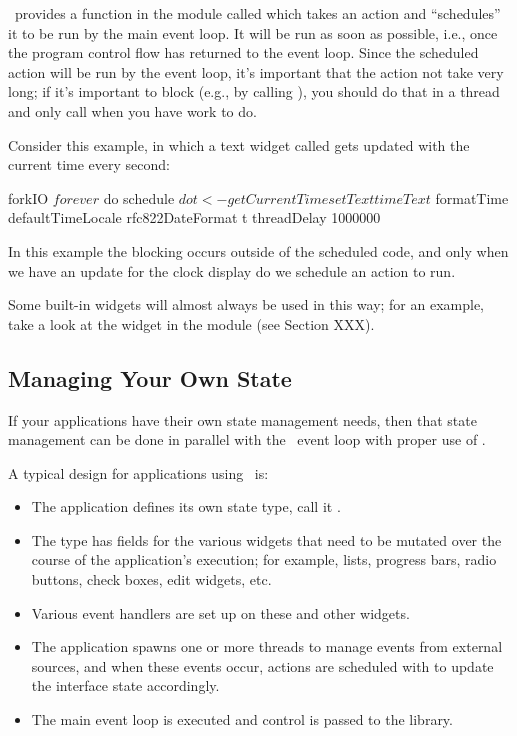 \vtyui\ provides a function in the  module called
 which takes an  action and ``schedules'' it to be
run by the main event loop.  It will be run as soon as possible, i.e.,
once the program control flow has returned to the event loop.  Since
the scheduled action will be run by the event loop, it's important
that the action not take very long; if it's important to block (e.g.,
by calling ), you should do that in
a thread and only call  when you have work to do.

Consider this example, in which a text widget called 
gets updated with the current time every second:

\begin{haskellcode}
 forkIO $
   forever $ do
     schedule $ do
       t <- getCurrentTime
       setText timeText $
         formatTime defaultTimeLocale rfc822DateFormat t
     threadDelay 1000000
\end{haskellcode}

In this example the blocking occurs outside of the scheduled code, and
only when we have an update for the clock display do we schedule an
action to run.

Some built-in widgets will almost always be used in this way; for an
example, take a look at the  widget in the
 module (see Section XXX).

\subsection{Managing Your Own State}

If your applications have their own state management needs, then that
state management can be done in parallel with the \vtyui\ event loop
with proper use of .

A typical design for applications using \vtyui\ is:

\begin{itemize}
\item The application defines its own state type, call it
  .
\item The  type has fields for the various widgets that
  need to be mutated over the course of the application's execution;
  for example, lists, progress bars, radio buttons, check boxes, edit
  widgets, etc.
\item Various event handlers are set up on these and other widgets.
\item The application spawns one or more threads to manage events from
  external sources, and when these events occur, actions are scheduled
  with  to update the interface state accordingly.
\item The main event loop is executed and control is passed to the
  library.
\end{itemize}
